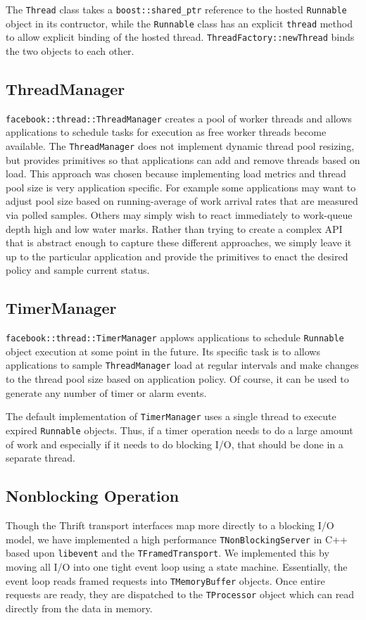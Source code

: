 \documentclass[nocopyrightspace,blockstyle]{sigplanconf}
\begin{document}
The {\tt Thread} class takes a {\tt boost::shared\_ptr} reference to the hosted
{\tt Runnable} object in its contructor, while the {\tt Runnable} class has an
explicit {\tt thread} method to allow explicit binding of the hosted thread.
{\tt ThreadFactory::newThread} binds the two objects to each other.

\subsection{ThreadManager}

{\tt facebook::thread::ThreadManager} creates a pool of worker threads and 
allows applications to schedule tasks for execution as free worker threads
become available.  The {\tt ThreadManager} does not implement dynamic 
thread pool resizing, but provides primitives so that applications can add
and remove threads based on load.  This approach was chosen because 
implementing load metrics and thread pool size is very application 
specific.  For example some applications may want to adjust pool size based
on running-average of work arrival rates that are measured via polled
samples.  Others may simply wish to react immediately to work-queue
depth high and low water marks.  Rather than trying to create a complex
API that is abstract enough to capture these different approaches, we 
simply leave it up to the particular application and provide the 
primitives to enact the desired policy and sample current status.

\subsection{TimerManager}

{\tt facebook::thread::TimerManager} applows applications to schedule
 {\tt Runnable} object execution at some point in the future.  Its specific task 
is to allows applications to sample {\tt ThreadManager} load at regular
intervals and make changes to the thread pool size based on application policy.
Of course, it can be used to generate any number of timer or alarm events.  

The default implementation of {\tt TimerManager} uses a single thread to
execute expired {\tt Runnable} objects.  Thus, if a timer operation needs to 
do a large amount of work and especially if it needs to do blocking I/O,
that should be done in a separate thread.

\subsection{Nonblocking Operation}
Though the Thrift transport interfaces map more directly to a blocking I/O
model, we have implemented a high performance \texttt{TNonBlockingServer}
in C++ based upon \texttt{libevent} and the \texttt{TFramedTransport}. We
implemented this by moving all I/O into one tight event loop using a
state machine. Essentially, the event loop reads framed requests into
\texttt{TMemoryBuffer} objects. Once entire requests are ready, they are
dispatched to the \texttt{TProcessor} object which can read directly from
the data in memory.
\end{document}
